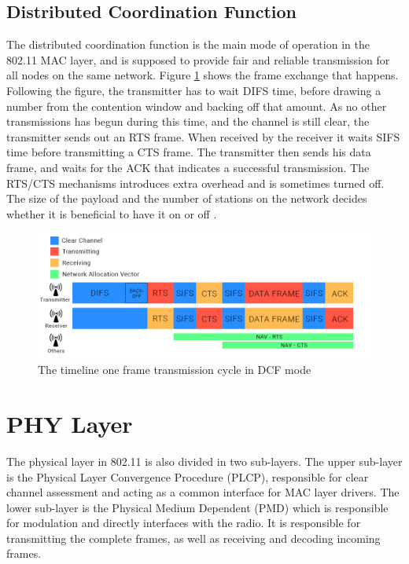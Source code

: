 	\subsection{Distributed Coordination Function}
	The distributed coordination function is the main mode of operation in the 802.11 MAC layer, and is supposed to provide fair and reliable 
	transmission for all nodes on the same network. Figure \ref{fig:dcfmode} shows the 
	frame exchange that happens. Following the figure, the transmitter has to wait DIFS time, before drawing 
	a number from the contention window and backing off that amount.
	As no other transmissions has begun during this time, and the channel is
	still clear, the transmitter sends out an RTS frame. When received by the receiver
	it waits SIFS time before transmitting a CTS frame. The transmitter then sends his
	data frame, and waits for the ACK that indicates a successful transmission. The 
	RTS/CTS mechanisms introduces extra overhead and is sometimes turned off. The
	size of the payload and the number of stations on the network decides
	whether it is beneficial to have it on or off \cite{DCFanalysis}.



	\begin{figure}
	\center
	\includegraphics[scale=0.35]{Images/DCF.jpg}
	\caption{The timeline one frame transmission cycle in DCF mode}
	\label{fig:dcfmode}
	\end{figure}



	\section{PHY Layer}
	The physical layer in 802.11 is also divided in two sub-layers. The upper sub-layer is the Physical Layer Convergence Procedure (PLCP), responsible for clear channel assessment and acting
	as a common interface for MAC layer drivers. The lower sub-layer is the Physical Medium Dependent (PMD) which is responsible for modulation and directly interfaces with
	the radio. It is responsible for transmitting the complete frames, as well as receiving and decoding incoming frames. 

